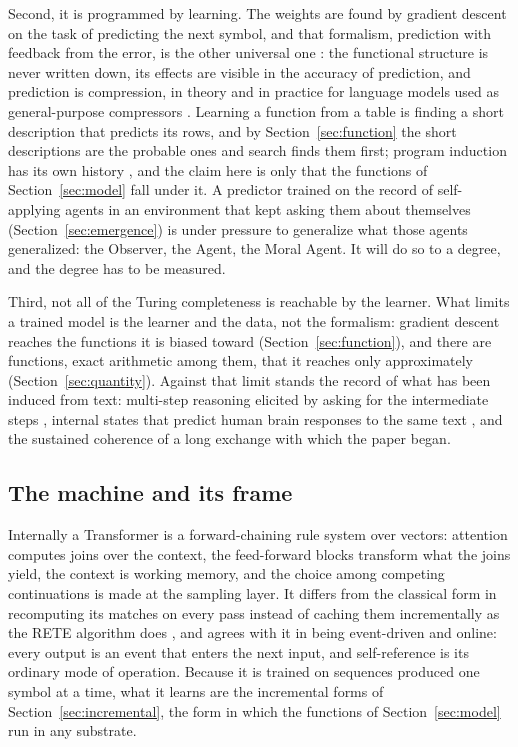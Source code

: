 Second, it is programmed by learning. The weights are found by gradient descent on the task of
predicting the next symbol, and that formalism, prediction with feedback from the error, is the other
universal one \citep{solomonoff1964a}: the functional structure is never written down, its effects are
visible in the accuracy of prediction, and prediction is compression, in theory and in practice for
language models used as general-purpose compressors \citep{deletang2024}. Learning a function from a
table is finding a short description that predicts its rows, and by Section~\ref{sec:function} the
short descriptions are the probable ones and search finds them first; program induction has its own
history \citep{solomonoff1964a,muggleton1994}, and the claim here is only that the functions of
Section~\ref{sec:model} fall under it. A predictor trained on the record of self-applying agents in an
environment that kept asking them about themselves (Section~\ref{sec:emergence}) is under pressure to
generalize what those agents generalized: the Observer, the Agent, the Moral Agent. It will do so to a
degree, and the degree has to be measured.

Third, not all of the Turing completeness is reachable by the learner. What limits a trained model is
the learner and the data, not the formalism: gradient descent reaches the functions it is biased
toward (Section~\ref{sec:function}), and there are functions, exact arithmetic among them, that it
reaches only approximately (Section~\ref{sec:quantity}). Against that limit stands the record of what
has been induced from text: multi-step reasoning elicited by asking for the intermediate steps
\citep{wei2022}, internal states that predict human brain responses to the same text
\citep{schrimpf2021,goldstein2022,caucheteux2022}, and the sustained coherence of a long exchange with
which the paper began.

\subsection{The machine and its frame}
\label{sec:machine}
\label{sec:language}
\label{sec:frame}
\label{sec:codes}
\label{sec:codes-known}
\label{sec:granularity}

Internally a Transformer is a forward-chaining rule system over vectors: attention computes joins over
the context, the feed-forward blocks transform what the joins yield, the context is working memory,
and the choice among competing continuations is made at the sampling layer. It differs from the
classical form in recomputing its matches on every pass instead of caching them incrementally as the
RETE algorithm does \citep{forgy1982}, and agrees with it in being event-driven and online: every
output is an event that enters the next input, and self-reference is its ordinary mode of operation.
Because it is trained on sequences produced one symbol at a time, what it learns are the incremental
forms of Section~\ref{sec:incremental}, the form in which the functions of Section~\ref{sec:model} run
in any substrate.

